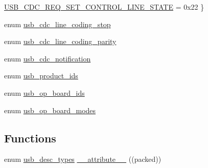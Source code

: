 \begin{DoxyCompactItemize}
\hyperlink{group___p_i_o_s___u_s_b___d_e_f_s_gga3544e22c57aa46b457ffbb09822caf9cabdd798c9c4eae60e6890da87b0821c01}{U\-S\-B\-\_\-\-C\-D\-C\-\_\-\-R\-E\-Q\-\_\-\-S\-E\-T\-\_\-\-C\-O\-N\-T\-R\-O\-L\-\_\-\-L\-I\-N\-E\-\_\-\-S\-T\-A\-T\-E} = 0x22
 \}
\item 
enum \hyperlink{group___p_i_o_s___u_s_b___d_e_f_s_ga233bd6f23d9895af9b693654d48af682}{usb\-\_\-cdc\-\_\-line\-\_\-coding\-\_\-stop} 
\item 
enum \hyperlink{group___p_i_o_s___u_s_b___d_e_f_s_gabc1f843b2823e8539facdbfeb734a5ad}{usb\-\_\-cdc\-\_\-line\-\_\-coding\-\_\-parity} 
\item 
enum \hyperlink{group___p_i_o_s___u_s_b___d_e_f_s_ga43113e1b9daab7bfc6e5fe6ff65b0fc7}{usb\-\_\-cdc\-\_\-notification} 
\item 
enum \hyperlink{group___p_i_o_s___u_s_b___d_e_f_s_gadd6f0f6378e0d944dffb726322ae5ddf}{usb\-\_\-product\-\_\-ids} 
\item 
enum \hyperlink{group___p_i_o_s___u_s_b___d_e_f_s_gaa03fd2fa7b7aa69d420bfea86dc519d3}{usb\-\_\-op\-\_\-board\-\_\-ids} 
\item 
enum \hyperlink{group___p_i_o_s___u_s_b___d_e_f_s_gafbdcb00e985ba79973c56e1da0a87635}{usb\-\_\-op\-\_\-board\-\_\-modes} 
\end{DoxyCompactItemize}
\subsection*{Functions}
\begin{DoxyCompactItemize}
\item 
enum \hyperlink{group___p_i_o_s___u_s_b___d_e_f_s_ga15dc30e657ffe4355ba53c2254eb28b5}{usb\-\_\-desc\-\_\-types} \hyperlink{group___p_i_o_s___u_s_b___d_e_f_s_ga3d1234b86c1e07d3decb640d63f05771}{\-\_\-\-\_\-attribute\-\_\-\-\_\-} ((packed))
\end{DoxyCompactItemize}
